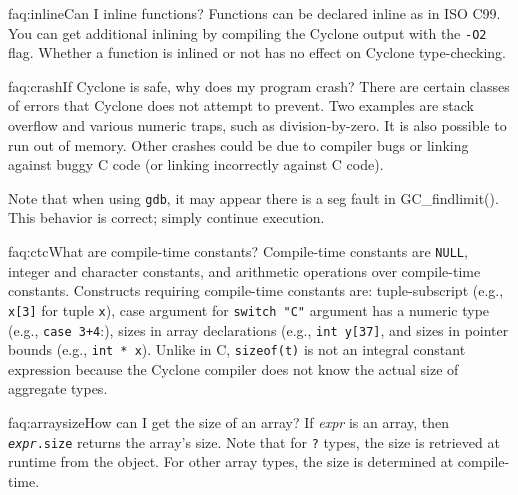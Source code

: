 \begin{faqa}{faq:inline}{Can I inline functions?}
Functions can be declared inline as in ISO C99.  You can get additional
inlining by compiling the Cyclone output with the \texttt{-O2} flag.
Whether a function is inlined or not has no effect on Cyclone
type-checking.
\end{faqa}

\begin{faqa}{faq:crash}{If Cyclone is safe, why does my program crash?}
There are certain classes of errors that Cyclone does not attempt to
prevent.  Two examples are stack overflow and various numeric traps,
such as division-by-zero.  It is also possible to run out of memory.
Other crashes could be due to compiler bugs or linking against buggy C
code (or linking incorrectly against C code).

Note that when using \texttt{gdb}, it may appear there is a seg fault
in GC_findlimit().  This behavior is correct; simply continue
execution.
\end{faqa}

\begin{faqa}{faq:ctc}{What are compile-time constants?}
Compile-time constants are \texttt{NULL}, integer and character
constants, and arithmetic operations over compile-time constants.
Constructs requiring compile-time constants are: tuple-subscript
(e.g.,
\texttt{x[3]} for tuple \texttt{x}), case argument for 
\texttt{switch "C"} argument has a numeric type (e.g., \texttt{case
  3+4}:), sizes in array declarations (e.g., \texttt{int y[37]}, and
sizes in pointer bounds (e.g., \texttt{int * x\rb}).  Unlike in
C, \texttt{sizeof(t)} is not an integral constant expression because
the Cyclone compiler does not know the actual size of aggregate types.
\end{faqa}

\begin{faqa}{faq:arraysize}{How can I get the size of an array?}
If \textit{expr} is an array, then \texttt{{\it expr}.size} returns
the array's size.  Note that for \texttt{?} types, the size is
retrieved at runtime from the object.  For other array types,
the size is determined at compile-time.
\end{faqa}

